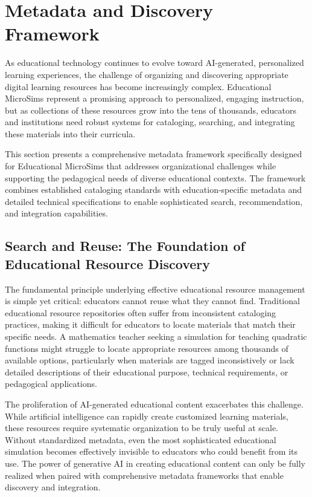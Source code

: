 \section{Metadata and Discovery Framework}
\label{sec:metadata}

As educational technology continues to evolve toward AI-generated, personalized learning experiences, the challenge of organizing and discovering appropriate digital learning resources has become increasingly complex. Educational MicroSims represent a promising approach to personalized, engaging instruction, but as collections of these resources grow into the tens of thousands, educators and institutions need robust systems for cataloging, searching, and integrating these materials into their curricula.

This section presents a comprehensive metadata framework specifically designed for Educational MicroSims that addresses organizational challenges while supporting the pedagogical needs of diverse educational contexts. The framework combines established cataloging standards with education-specific metadata and detailed technical specifications to enable sophisticated search, recommendation, and integration capabilities.

\subsection{Search and Reuse: The Foundation of Educational Resource Discovery}

The fundamental principle underlying effective educational resource management is simple yet critical: educators cannot reuse what they cannot find. Traditional educational resource repositories often suffer from inconsistent cataloging practices, making it difficult for educators to locate materials that match their specific needs. A mathematics teacher seeking a simulation for teaching quadratic functions might struggle to locate appropriate resources among thousands of available options, particularly when materials are tagged inconsistively or lack detailed descriptions of their educational purpose, technical requirements, or pedagogical applications.

The proliferation of AI-generated educational content exacerbates this challenge. While artificial intelligence can rapidly create customized learning materials, these resources require systematic organization to be truly useful at scale. Without standardized metadata, even the most sophisticated educational simulation becomes effectively invisible to educators who could benefit from its use. The power of generative AI in creating educational content can only be fully realized when paired with comprehensive metadata frameworks that enable discovery and integration.

